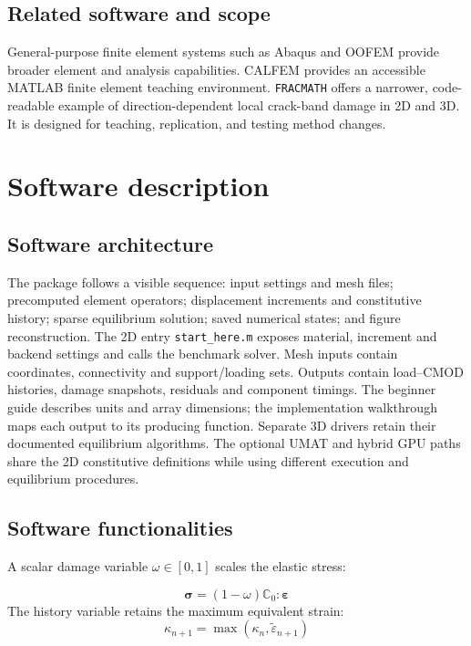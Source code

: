 \documentclass[preprint,11pt,a4paper]{elsarticle}
\begin{document}
\subsection{Related software and scope}

General-purpose finite element systems such as Abaqus \citep{abaqus} and
OOFEM \citep{oofem} provide broader element and analysis capabilities.
CALFEM \citep{calfem} provides an accessible MATLAB finite element teaching
environment. \texttt{FRACMATH} offers a narrower, code-readable example of
direction-dependent local crack-band damage in 2D and 3D. It is designed
for teaching, replication, and testing method changes.

\section{Software description}

\subsection{Software architecture}

The package follows a visible sequence: input settings and mesh files;
precomputed element operators; displacement increments and constitutive
history; sparse equilibrium solution; saved numerical states; and figure
reconstruction. The 2D entry \texttt{start\_here.m} exposes material,
increment and backend settings and calls the benchmark solver. Mesh inputs
contain coordinates, connectivity and support/loading sets. Outputs contain
load--CMOD histories, damage snapshots, residuals and component timings.
The beginner guide describes units and array dimensions; the implementation
walkthrough maps each output to its producing function. Separate 3D drivers
retain their documented equilibrium algorithms. The optional UMAT and hybrid
GPU paths share the 2D constitutive definitions while using different
execution and equilibrium procedures.

\subsection{Software functionalities}

A scalar damage variable $\omega\in[0,1]$ scales the elastic stress:

\begin{equation}
\boldsymbol\sigma=(1-\omega)\mathbb C_0:\boldsymbol\varepsilon
\end{equation}
The history variable retains the maximum equivalent strain:
\begin{equation}
\kappa_{n+1}=\max(\kappa_n,\tilde\varepsilon_{n+1})
\end{equation}
\end{document}
